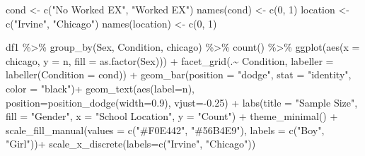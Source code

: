 \documentclass[
  letterpaper,
  DIV=11,
  numbers=noendperiod]{scrartcl}
\newenvironment{Shaded}{\begin{snugshade}}{\end{snugshade}}
\newcommand{\AttributeTok}[1]{\textcolor[rgb]{0.49,0.56,0.16}{#1}}
\newcommand{\DecValTok}[1]{\textcolor[rgb]{0.25,0.63,0.44}{#1}}
\newcommand{\FloatTok}[1]{\textcolor[rgb]{0.25,0.63,0.44}{#1}}
\newcommand{\FunctionTok}[1]{\textcolor[rgb]{0.02,0.16,0.49}{#1}}
\newcommand{\NormalTok}[1]{\textcolor[rgb]{0.00,0.44,0.13}{#1}}
\newcommand{\OtherTok}[1]{\textcolor[rgb]{0.00,0.44,0.13}{#1}}
\newcommand{\SpecialCharTok}[1]{\textcolor[rgb]{0.25,0.44,0.63}{#1}}
\newcommand{\StringTok}[1]{\textcolor[rgb]{0.25,0.44,0.63}{#1}}
\begin{document}
\begin{Shaded}
\begin{Highlighting}[]
\NormalTok{cond }\OtherTok{\textless{}{-}} \FunctionTok{c}\NormalTok{(}\StringTok{"No Worked EX"}\NormalTok{, }\StringTok{"Worked EX"}\NormalTok{)}
\FunctionTok{names}\NormalTok{(cond) }\OtherTok{\textless{}{-}} \FunctionTok{c}\NormalTok{(}\DecValTok{0}\NormalTok{, }\DecValTok{1}\NormalTok{)}
\NormalTok{location }\OtherTok{\textless{}{-}} \FunctionTok{c}\NormalTok{(}\StringTok{"Irvine"}\NormalTok{, }\StringTok{"Chicago"}\NormalTok{)}
\FunctionTok{names}\NormalTok{(location) }\OtherTok{\textless{}{-}} \FunctionTok{c}\NormalTok{(}\DecValTok{0}\NormalTok{, }\DecValTok{1}\NormalTok{)}

\NormalTok{df1 }\SpecialCharTok{\%\textgreater{}\%} \FunctionTok{group\_by}\NormalTok{(Sex, Condition, chicago) }\SpecialCharTok{\%\textgreater{}\%} 
  \FunctionTok{count}\NormalTok{() }\SpecialCharTok{\%\textgreater{}\%} 
  \FunctionTok{ggplot}\NormalTok{(}\FunctionTok{aes}\NormalTok{(}\AttributeTok{x =}\NormalTok{ chicago, }\AttributeTok{y =}\NormalTok{ n, }\AttributeTok{fill =} \FunctionTok{as.factor}\NormalTok{(Sex))) }\SpecialCharTok{+} 
  \FunctionTok{facet\_grid}\NormalTok{(.}\SpecialCharTok{\textasciitilde{}}\NormalTok{ Condition, }
             \AttributeTok{labeller =} \FunctionTok{labeller}\NormalTok{(}\AttributeTok{Condition =}\NormalTok{ cond)) }\SpecialCharTok{+}
  \FunctionTok{geom\_bar}\NormalTok{(}\AttributeTok{position =} \StringTok{"dodge"}\NormalTok{, }\AttributeTok{stat =} \StringTok{"identity"}\NormalTok{, }\AttributeTok{color =} \StringTok{"black"}\NormalTok{)}\SpecialCharTok{+}
  \FunctionTok{geom\_text}\NormalTok{(}\FunctionTok{aes}\NormalTok{(}\AttributeTok{label=}\NormalTok{n),  }\AttributeTok{position=}\FunctionTok{position\_dodge}\NormalTok{(}\AttributeTok{width=}\FloatTok{0.9}\NormalTok{), }
            \AttributeTok{vjust=}\SpecialCharTok{{-}}\FloatTok{0.25}\NormalTok{) }\SpecialCharTok{+}
  \FunctionTok{labs}\NormalTok{(}\AttributeTok{title =} \StringTok{"Sample Size"}\NormalTok{, }\AttributeTok{fill =} \StringTok{"Gender"}\NormalTok{, }\AttributeTok{x =} \StringTok{"School Location"}\NormalTok{, }\AttributeTok{y =} \StringTok{"Count"}\NormalTok{) }\SpecialCharTok{+}
  \FunctionTok{theme\_minimal}\NormalTok{() }\SpecialCharTok{+}
  \FunctionTok{scale\_fill\_manual}\NormalTok{(}\AttributeTok{values =} \FunctionTok{c}\NormalTok{(}\StringTok{"\#F0E442"}\NormalTok{, }\StringTok{"\#56B4E9"}\NormalTok{), }\AttributeTok{labels =} \FunctionTok{c}\NormalTok{(}\StringTok{"Boy"}\NormalTok{, }\StringTok{"Girl"}\NormalTok{))}\SpecialCharTok{+}
  \FunctionTok{scale\_x\_discrete}\NormalTok{(}\AttributeTok{labels=}\FunctionTok{c}\NormalTok{(}\StringTok{"Irvine"}\NormalTok{, }\StringTok{"Chicago"}\NormalTok{))}
\end{Highlighting}
\end{Shaded}
\end{document}
